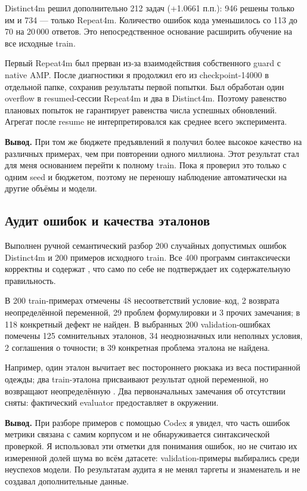 Distinct4m решил дополнительно 212 задач (+1.0661 п.п.):
946 решены только им и 734 --- только Repeat4m.
Количество ошибок кода уменьшилось со 113 до 70 на 20\,000 ответов.
Это непосредственное основание расширить обучение на все исходные train.

Первый Repeat4m был прерван из-за взаимодействия собственного guard
с native AMP. После диагностики я продолжил его из checkpoint-14000
в отдельной папке, сохранив результаты первой попытки.
Был обработан один overflow в resumed-сессии Repeat4m
и два в Distinct4m. Поэтому равенство плановых попыток не гарантирует
равенства числа успешных обновлений. Агрегат  после
resume не интерпретировался как среднее всего эксперимента.

\textbf{Вывод.} При том же бюджете предъявлений я получил более высокое
качество на различных примерах, чем при повторении одного миллиона.
Этот результат стал для меня основанием перейти к полному train.
Пока я проверил это только с одним seed и бюджетом, поэтому не переношу
наблюдение автоматически на другие объёмы и модели.

\subsection{Аудит ошибок и качества эталонов}
Выполнен ручной семантический разбор 200 случайных допустимых ошибок
Distinct4m и 200 примеров исходного train. Все 400 программ синтаксически
корректны и содержат , что само по себе не подтверждает
их содержательную правильность.

В 200 train-примерах отмечены 48 несоответствий условие--код,
2 возврата неопределённой переменной, 29 проблем формулировки и 3 прочих
замечания; в 118 конкретный дефект не найден.
В выбранных 200 validation-ошибках помечены 125 сомнительных эталонов,
34 неоднозначных или неполных условия, 2 соглашения о точности;
в 39 конкретная проблема эталона не найдена.

Например, один эталон вычитает вес постороннего рюкзака из веса
постиранной одежды; два train-эталона присваивают результат одной
переменной, но возвращают неопределённую .
Два первоначальных замечания об отсутствии  сняты:
фактический evaluator предоставляет  в окружении.

\textbf{Вывод.} При разборе примеров с помощью Codex я увидел,
что часть ошибок метрики связана с самим корпусом и не обнаруживается
синтаксической проверкой. Я использовал эти отметки для понимания ошибок,
но не считаю их измеренной долей шума во всём датасете:
validation-примеры выбирались среди неуспехов модели.
По результатам аудита я не менял таргеты и знаменатель \pass{}
и не создавал дополнительные данные.

